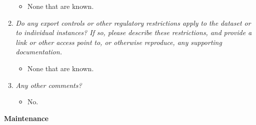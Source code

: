 \documentclass[
]{article}
\providecommand{\tightlist}{%
  \setlength{\itemsep}{0pt}\setlength{\parskip}{0pt}}
\begin{document}
\begin{enumerate}
  \begin{itemize}
  \tightlist
  \item
    None that are known.
  \end{itemize}
\item
  \emph{Do any export controls or other regulatory restrictions apply to the dataset or to individual instances? If so, please describe these restrictions, and provide a link or other access point to, or otherwise reproduce, any supporting documentation.}

  \begin{itemize}
  \tightlist
  \item
    None that are known.
  \end{itemize}
\item
  \emph{Any other comments?}

  \begin{itemize}
  \tightlist
  \item
    No.
  \end{itemize}
\end{enumerate}

\textbf{Maintenance}
\end{document}
